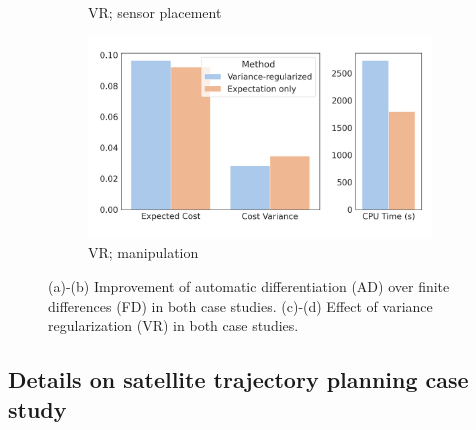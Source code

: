 \begin{figure}[t]
\begin{subfigure}[t]{0.25\linewidth}
        \caption{VR; sensor placement}
    \end{subfigure}%
    \begin{subfigure}[t]{0.25\linewidth}
        \centering
        \includegraphics[width=\linewidth]{images/ch5/mam_ablation_vr.png}
        \caption{VR; manipulation}
    \end{subfigure}
    \caption{(a)-(b) Improvement of automatic differentiation (AD) over finite differences (FD) in both case studies. (c)-(d) Effect of variance regularization (VR) in both case studies.}
    \label{app:ch5:fig:ablation}
\end{figure}

\subsection{Details on satellite trajectory planning case study}

